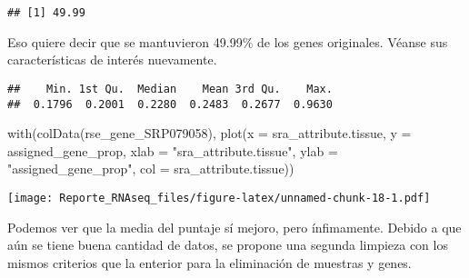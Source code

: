 \documentclass[
]{article}
\newenvironment{Shaded}{\begin{snugshade}}{\end{snugshade}}
\newcommand{\AttributeTok}[1]{\textcolor[rgb]{0.77,0.63,0.00}{#1}}
\newcommand{\CommentTok}[1]{\textcolor[rgb]{0.56,0.35,0.01}{\textit{#1}}}
\newcommand{\FunctionTok}[1]{\textcolor[rgb]{0.00,0.00,0.00}{#1}}
\newcommand{\NormalTok}[1]{#1}
\newcommand{\SpecialCharTok}[1]{\textcolor[rgb]{0.00,0.00,0.00}{#1}}
\newcommand{\StringTok}[1]{\textcolor[rgb]{0.31,0.60,0.02}{#1}}
\begin{document}
\begin{verbatim}
## [1] 49.99
\end{verbatim}

Eso quiere decir que se mantuvieron 49.99\% de los genes originales.
Véanse sus características de interés nuevamente.

\begin{Shaded}
\end{Shaded}

\begin{verbatim}
##    Min. 1st Qu.  Median    Mean 3rd Qu.    Max. 
##  0.1796  0.2001  0.2280  0.2483  0.2677  0.9630
\end{verbatim}

\begin{Shaded}
\begin{Highlighting}[]
\FunctionTok{with}\NormalTok{(}\FunctionTok{colData}\NormalTok{(rse\_gene\_SRP079058), }\FunctionTok{plot}\NormalTok{(}\AttributeTok{x =}\NormalTok{ sra\_attribute.tissue,}
                                       \AttributeTok{y =}\NormalTok{ assigned\_gene\_prop,}
                                       \AttributeTok{xlab =} \StringTok{"sra\_attribute.tissue"}\NormalTok{,}
                                       \AttributeTok{ylab =} \StringTok{"assigned\_gene\_prop"}\NormalTok{,}
                                       \AttributeTok{col =}\NormalTok{ sra\_attribute.tissue))}
\end{Highlighting}
\end{Shaded}

\texttt{[image: Reporte\_RNAseq\_files/figure-latex/unnamed-chunk-18-1.pdf]}

Podemos ver que la media del puntaje sí mejoro, pero ínfimamente. Debido
a que aún se tiene buena cantidad de datos, se propone una segunda
limpieza con los mismos criterios que la enterior para la eliminación de
muestras y genes.
\end{document}
